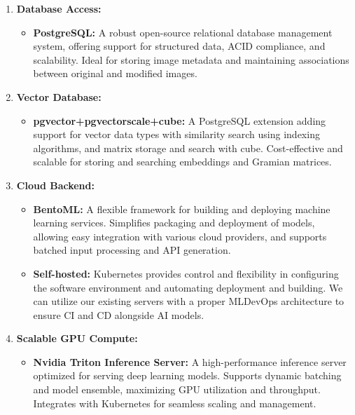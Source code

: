 \begin{enumerate}
\item \textbf{Database Access:}
    \begin{itemize}
        \item \textbf{PostgreSQL:} A robust open-source relational database management system, offering support for structured data, ACID compliance, and scalability. Ideal for storing image metadata and maintaining associations between original and modified images.
    \end{itemize}

\item \textbf{Vector Database:}
    \begin{itemize}
        \item \textbf{pgvector+pgvectorscale+cube:} A PostgreSQL extension adding support for vector data types with similarity search using indexing algorithms, and matrix storage and search with cube. Cost-effective and scalable for storing and searching embeddings and Gramian matrices.
    \end{itemize}

\item \textbf{Cloud Backend:}
    \begin{itemize}
        \item \textbf{BentoML:} A flexible framework for building and deploying machine learning services. Simplifies packaging and deployment of models, allowing easy integration with various cloud providers, and supports batched input processing and API generation.
        \item \textbf{Self-hosted:} Kubernetes provides control and flexibility in configuring the software environment and automating deployment and building. We can utilize our existing servers with a proper MLDevOps architecture to ensure CI and CD alongside AI models.
    \end{itemize}

\item \textbf{Scalable GPU Compute:}
    \begin{itemize}
        \item \textbf{Nvidia Triton Inference Server:} A high-performance inference server optimized for serving deep learning models. Supports dynamic batching and model ensemble, maximizing GPU utilization and throughput. Integrates with Kubernetes for seamless scaling and management.
    \end{itemize}
\end{enumerate}


